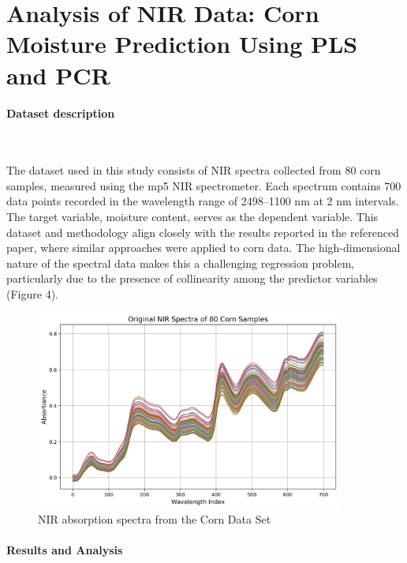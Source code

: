 \documentclass[11pt,twoside,a4paper]{article}
\begin{document}
\section{Analysis of NIR Data: Corn Moisture Prediction Using PLS and PCR}

\paragraph{Dataset description} \ \

The dataset used in this study consists of NIR spectra collected from 80 corn samples, measured using the mp5 NIR spectrometer. Each spectrum contains 700 data points recorded in the wavelength range of 2498–1100 nm at 2 nm intervals. The target variable, moisture content, serves as the dependent variable. This dataset and methodology align closely with the results reported in the referenced paper, where similar approaches were applied to corn data. The high-dimensional nature of the spectral data makes this a challenging regression problem, particularly due to the presence of collinearity among the predictor variables (Figure 4).

\begin{figure}[H]
    \centering
    \includegraphics[width=0.9\textwidth]{NIR_first_plot.png}
    \caption{NIR absorption spectra from the Corn Data Set}
    \label{fig:NIR_analysis}
\end{figure}

\paragraph{Results and Analysis } \ \
\end{document}
